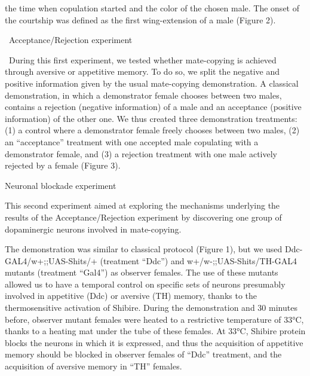 \documentclass{article}
\begin{document}
\bigskip


\bigskip


\bigskip


\bigskip


\bigskip


\bigskip


\bigskip


\bigskip


\bigskip


\bigskip

the time when copulation started and the color of the chosen male. The onset of the courtship was defined as the first wing-extension of a male (Figure 2).


\bigskip


\bigskip

\ Acceptance/Rejection experiment


\bigskip

\ During this first experiment, we tested whether mate-copying is achieved through aversive or appetitive memory. To do so, we split the negative and positive information given by the usual mate-copying demonstration. A classical demonstration, in which a demonstrator female chooses between two males, contains a rejection (negative information) of a male and an acceptance (positive information) of the other one. We thus created three demonstration treatments: (1) a control where a demonstrator female freely chooses between two males, (2) an “acceptance” treatment with one accepted male copulating with a demonstrator female, and (3) a rejection treatment with one male actively rejected by a female (Figure 3).


\bigskip

Neuronal blockade experiment


\bigskip

This second experiment aimed at exploring the mechanisms underlying the results of the Acceptance/Rejection experiment by discovering one group of dopaminergic neurons involved in mate-copying.


\bigskip

The demonstration was similar to classical protocol (Figure 1), but we used Ddc-GAL4/w+;;UAS-Shits/+ (treatment “Ddc”) and w+/w{}-;;UAS-Shits/TH-GAL4 mutants (treatment “Gal4”) as observer females. The use of these mutants allowed us to have a temporal control on specific sets of neurons presumably involved in appetitive (Ddc) or aversive (TH) memory, thanks to the thermosensitive activation of Shibire. During the demonstration and 30 minutes before, observer mutant females were heated to a restrictive temperature of 33°C, thanks to a heating mat under the tube of these females. At 33°C, Shibire protein blocks the neurons in which it is expressed, and thus the acquisition of appetitive memory should be blocked in observer females of “Ddc” treatment, and the acquisition of aversive memory in “TH” females. 
\end{document}
